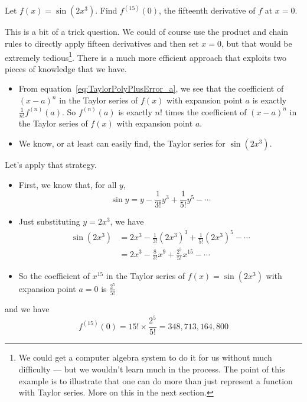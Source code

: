 \begin{eg}\label{eg:SRfindDeriv}
Let $f(x) = \sin(2x^3)$. Find $f^{(15)}(0)$, the fifteenth derivative
of $f$ at $x=0$.

\soln
This is a bit of a trick question. We could of course use the
product and chain rules to directly apply fifteen derivatives
and then set $x=0$, but that would be extremely tedious\footnote{We could get a computer algebra system to do it for
us without much difficulty --- but we wouldn't learn much in the process. The point of this example is to illustrate
that one can do more than just represent a function with Taylor series. More on this in the next section.}. There
is a much more efficient approach that exploits two pieces of
knowledge that we have.
\begin{itemize}
\item From equation~\eqref{eq:TaylorPolyPlusError_a}, we see that the coefficient
of $(x-a)^n$ in the Taylor series of $f(x)$ with expansion point $a$
is exactly $\frac{1}{n!} f^{(n)}(a)$. So $f^{(n)}(a)$ is exactly
$n!$ times the coefficient
of $(x-a)^n$ in the Taylor series of $f(x)$ with expansion point $a$.

\item We know, or at least can easily find, the Taylor series
for $\sin(2x^3)$.
\end{itemize}
Let's apply that strategy.
\begin{itemize}
\item First, we know that, for all $y$,
\begin{equation*}
\sin y = y-\frac{1}{3!}y^3+\frac{1}{5!}y^5-\cdots
\end{equation*}
\item
Just substituting $y= 2x^3$, we have
\begin{align*}
\sin(2 x^3) &= 2x^3-\frac{1}{3!}{(2x^3)}^3+\frac{1}{5!}{(2x^3)}^5-\cdots \\
&= 2x^3-\frac{8}{3!}x^9+\frac{2^5}{5!}x^{15}-\cdots
\end{align*}
\item
So the coefficient of $x^{15}$ in the Taylor series of
$f(x)=\sin(2x^3)$ with expansion point $a=0$ is $\frac{2^5}{5!}$
\end{itemize}
and we have
\begin{equation*}
f^{(15)}(0) = 15!\times \frac{2^5}{5!}
 = 348{,}713{,}164{,}800
\end{equation*}

\end{eg}

